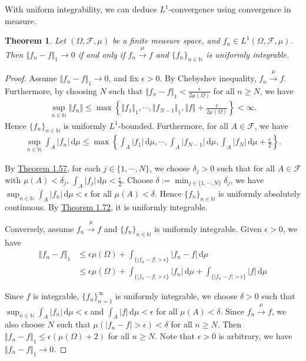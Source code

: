 \documentclass{article}
\numberwithin{equation}{section}
\renewcommand{\d}{\mathrm{d}}
\theoremstyle{plain}
\newtheorem{theorem}{Theorem}[section]
\theoremstyle{definition}
\begin{document}
With uniform integrability, we can deduce $L^1$-convergence using convergence in measure.

\begin{theorem}\label{thm:1.73} Let $(\Omega,\mathscr{F},\mu)$ be a finite measure space, and $f_n\in L^1(\Omega,\mathscr{F},\mu)$. Then $\Vert f_n-f\Vert_1\to 0$ if and only if $f_n\overset{\mu}{\to}f$ and $\{f_n\}_{n\in\mathbb{N}}$ is uniformly integrable.
\end{theorem}
\begin{proof}
Assume $\Vert f_n-f\Vert_1\to 0$, and fix $\epsilon>0$. By Chebyshev inequality, $f_n\overset{\mu}{\to} f$. Furthermore, by choosing $N$ such that $\Vert f_n-f\Vert_1<\frac{\epsilon}{2\mu(\Omega)}$ for all $n\geq N$, we have
\begin{align*}
	\sup_{n\in\mathbb{N}}\Vert f_n\Vert\leq\max\left\{\Vert f_1\Vert_1,\cdots,\Vert f_{N-1}\Vert_1,\Vert f\Vert+\frac{\epsilon}{2\mu(\Omega)}\right\}<\infty.
\end{align*}
Hence $\{f_n\}_{n\in\mathbb{N}}$ is uniformly $L^1$-bounded. Furthermore, for all $A\in\mathscr{F}$, we have 
\begin{align*}
	\sup_{n\in\mathbb{N}}\int_A\vert f_n\vert\,\d \mu\leq\max\left\{\int_A\vert f_1\vert\,\d \mu,\cdots,\int_A\vert f_{N-1}\vert\,\d \mu,\int_A\vert f_N\vert\,\d \mu+\frac{\epsilon}{2}\right\}.
\end{align*}

By \hyperref[thm:1.57]{Theorem 1.57}, for each $j\in\{1,\cdots,N\}$, we choose $\delta_j>0$ such that for all $A\in\mathscr{F}$ with $\mu(A)<\delta_j$, $\int_A\vert f_j\vert\,\d \mu<\frac{\epsilon}{2}$. Choose $\delta:=\min_{j\in\{1,\cdots,N\}}\delta_j$, we have $\sup_{n\in\mathbb{N}}\int_A\vert f_n\vert\,\d \mu<\epsilon$ for all $\mu(A)<\delta$. Hence $\{f_n\}_{n\in\mathbb{N}}$ is uniformly absolutely continuous. By \hyperref[thm:1.72]{Theorem 1.72}, it is uniformly integrable.\vspace{0.1cm}

Conversely, assume $f_n\overset{\mu}{\to} f$ and $\{f_n\}_{n\in\mathbb{N}}$ is uniformly integrable. Given $\epsilon>0$, we have
\begin{align*}
\Vert f_n - f\Vert_1 &\leq \epsilon\mu(\Omega) + \int_{\{\vert f_n-f\vert>\epsilon\}}\vert f_n-f\vert\,\d \mu\\
&\leq \epsilon\mu(\Omega) + \int_{\{\vert f_n-f\vert>\epsilon\}}\vert f_n\vert\,\d \mu + \int_{\{\vert f_n-f\vert>\epsilon\}}\vert f\vert\,\d \mu
\end{align*}

Since $f$ is integrable, $\{f_n\}_{n=1}^\infty$ is uniformly integrable, we choose $\delta>0$ such that $\sup_{n\in\mathbb{N}}\int_A\vert f_n\vert\,\d \mu<\epsilon$ and $\int_A\vert f\vert\,\d \mu<\epsilon$ for all $\mu(A)<\delta$. Since $f_n\overset{\mu}{\to}f$, we also choose $N$ such that $\mu(\vert f_n - f\vert>\epsilon)<\delta$ for all $n\geq N$. Then $\Vert f_n-f\Vert_1\leq\epsilon(\mu(\Omega)+2)$ for all $n\geq N$. Note that $\epsilon>0$ is arbitrary, we have $\Vert f_n-f\Vert_1\to 0$.
\end{proof}
\end{document}
